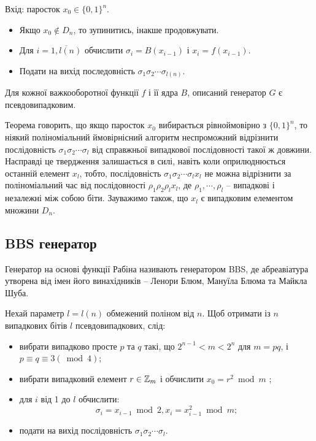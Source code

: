 \begin{algorithm}
Вхід: паросток $x_0 \in \{0,1\}^n$.
\begin{itemize}
\item Якщо $x_0 \not\in D_n$, то зупинитись, інакше продовжувати. 
\item Для $i = \overline{1, l(n)}$ обчислити $\sigma_i = B(x_{i-1})$ і $x_i=f(x_{i-1})$.
\item Подати на вихід последовність $\sigma_1\sigma_2\cdots\sigma_{l(n)}$.
\end{itemize}
\end{algorithm}


\begin{theorem}\label{theorem:1}
Для кожної важкооборотної функції $f$ і її ядра $B$, описаний генератор $G$ є псевдовипадковим. 
\end{theorem}

\begin{remark}
Теорема говорить, що якщо паросток $x_0$  вибирається рівноймовірно з $\{0,1\}^n$, то ніякий поліноміальний ймовірнісний алгоритм неспроможний відрізнити послідовність $\sigma_1\sigma_2\cdots\sigma_l $ від справжньої випадкової послідовності такої ж довжини. Насправді це твердження залишається в силі, навіть коли оприлюднюється останній елемент  $x_l$, тобто, послідовність $\sigma_1\sigma_2\cdots\sigma_l x_l$ не можна відрізнити за поліноміальний час від послідовності $\rho_1\rho_2\rho_l x_l$, де $\rho_1,\cdots,\rho_l$ -- випадкові і незалежні між собою біти. Зауважимо також, що $x_l$ є випадковим елементом множини $D_n$.
\end{remark}

\subsection{BBS генератор}

Генератор на основі функції Рабіна називають генератором BBS, де абреавіатура утворена від імен його винахідників -- Ленори Блюм, Мануїла Блюма та Майкла Шуба. \par
Нехай параметр $l=l(n)$ обмежений поліном від $n$. Щоб отримати із $n$ випадкових бітів $l$ псевдовипадкових, слід:
\begin{itemize}
\item вибрати випадково просте $p$ та $q$ такі, що $2^{n-1} < m < 2^n$ для $m=pq$, і $p\equiv q \equiv 3(\bmod 4)$;
\item вибрати випадковий елемент $r \in \mathbb Z_{m}$ і обчислити $x_0=r^2 \bmod m$ ;
\item для $i$ від 1 до $l$ обчислити: 
\[
\sigma_i=x_{i-1} \bmod 2, x_i=x^2_{i-1} \bmod m;
\]
\item подати на вихід послідовність $\sigma_1\sigma_2\cdots\sigma_l $.
\end{itemize}

